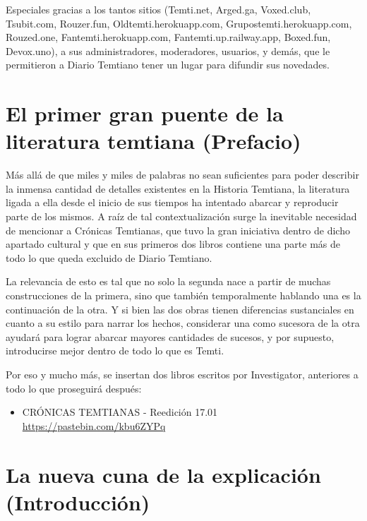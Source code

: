 \documentclass[
]{book}
\providecommand{\tightlist}{%
  \setlength{\itemsep}{0pt}\setlength{\parskip}{0pt}}
\begin{document}
Especiales gracias a los tantos sitios (Temti.net, Arged.ga, Voxed.club, Tsubit.com, Rouzer.fun, Oldtemti.herokuapp.com, Grupostemti.herokuapp.com, Rouzed.one, Fantemti.herokuapp.com, Fantemti.up.railway.app, Boxed.fun, Devox.uno), a sus administradores, moderadores, usuarios, y demás, que le permitieron a Diario Temtiano tener un lugar para difundir sus novedades.

\hypertarget{el-primer-gran-puente-de-la-literatura-temtiana-prefacio}{%
\chapter{El primer gran puente de la literatura temtiana (Prefacio)}\label{el-primer-gran-puente-de-la-literatura-temtiana-prefacio}}

Más allá de que miles y miles de palabras no sean suficientes para poder describir la inmensa cantidad de detalles existentes en la Historia Temtiana, la literatura ligada a ella desde el inicio de sus tiempos ha intentado abarcar y reproducir parte de los mismos. A raíz de tal contextualización surge la inevitable necesidad de mencionar a Crónicas Temtianas, que tuvo la gran iniciativa dentro de dicho apartado cultural y que en sus primeros dos libros contiene una parte más de todo lo que queda excluido de Diario Temtiano.

La relevancia de esto es tal que no solo la segunda nace a partir de muchas construcciones de la primera, sino que también temporalmente hablando una es la continuación de la otra. Y si bien las dos obras tienen diferencias sustanciales en cuanto a su estilo para narrar los hechos, considerar una como sucesora de la otra ayudará para lograr abarcar mayores cantidades de sucesos, y por supuesto, introducirse mejor dentro de todo lo que es Temti.

Por eso y mucho más, se insertan dos libros escritos por Investigator, anteriores a todo lo que proseguirá después:

\begin{itemize}
\tightlist
\item
  CRÓNICAS TEMTIANAS - Reedición 17.01 \url{https://pastebin.com/kbu6ZYPq}
\end{itemize}

\hypertarget{la-nueva-cuna-de-la-explicaciuxf3n-introducciuxf3n}{%
\chapter{La nueva cuna de la explicación (Introducción)}\label{la-nueva-cuna-de-la-explicaciuxf3n-introducciuxf3n}}
\end{document}
